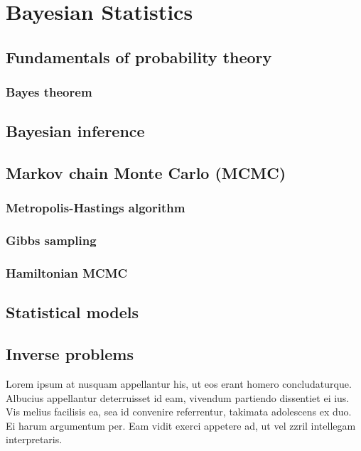 
\chapter{Bayesian Statistics}\label{ch:statistics}

\section{Fundamentals of probability theory}
\subsection{Bayes theorem}

\section{Bayesian inference}

\section{Markov chain Monte Carlo (MCMC)}
\subsection{Metropolis-Hastings algorithm}
\subsection{Gibbs sampling}
\subsection{Hamiltonian MCMC}

\section{Statistical models}

\section{Inverse problems}

Lorem ipsum at nusquam appellantur his, ut eos erant homero
concludaturque. Albucius appellantur deterruisset id eam, vivendum
partiendo dissentiet ei ius. Vis melius facilisis ea, sea id convenire
referrentur, takimata adolescens ex duo. Ei harum argumentum per. Eam
vidit exerci appetere ad, ut vel zzril intellegam interpretaris.

